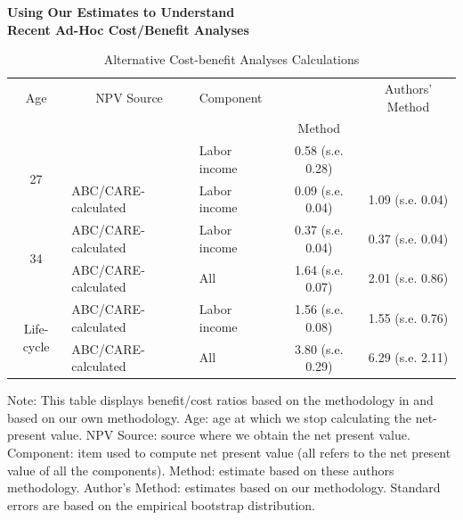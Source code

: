 \documentclass[static]{JJH-Beamer}
\newcommand{\mc}{\multicolumn}
\begin{document}
\begin{frame}

\begin{center}
\textbf{Using Our Estimates to Understand\\ Recent Ad-Hoc Cost/Benefit Analyses}
\end{center}

\end{frame}

\begin{frame}

\begin{table}[H]
\caption{Alternative Cost-benefit Analyses Calculations}\label{table:comparing}
\begin{center}
\begin{tabular}{cllcc}
\toprule
Age & \mc{1}{c}{NPV Source} & Component & \citet{Kline_Walters_2016_QJE} & Authors' Method \\
& & & Method & \\
\midrule
\multirow{2}{*}{27} & \cite{Chetty_Friedman_etal_2011_QJoE} & Labor income & 0.58 (s.e. 0.28) &  \\
& ABC/CARE-calculated & Labor income & 0.09 (s.e. 0.04) &  1.09 (s.e. 0.04)\\
\midrule
\multirow{2}{*}{34} & ABC/CARE-calculated & Labor income & 0.37 (s.e. 0.04) & 0.37 (s.e. 0.04) \\
& ABC/CARE-calculated & All & 1.64 (s.e. 0.07) &  2.01 (s.e. 0.86) \\
\midrule
\multirow{2}{*}{Life-cycle} &  ABC/CARE-calculated & Labor income & 1.56 (s.e. 0.08) & 1.55 (s.e. 0.76) \\
& ABC/CARE-calculated & All & 3.80 (s.e. 0.29) & 6.29 (s.e. 2.11) \\
\bottomrule
\end{tabular}
\end{center}
{\flushleft \tiny Note: This table displays benefit/cost ratios based on the methodology in \citet{Kline_Walters_2016_QJE} and based on our own methodology. Age: age at which we stop calculating the net-present value. NPV Source: source where we obtain the net present value. Component: item used to compute net present value (all refers to the net present value of all the components). \citet{Kline_Walters_2016_QJE} Method: estimate based on these authors methodology. Author's Method: estimates based on our methodology. Standard errors are based on the empirical bootstrap distribution.\\}
\end{table}

\end{frame}
\end{document}
